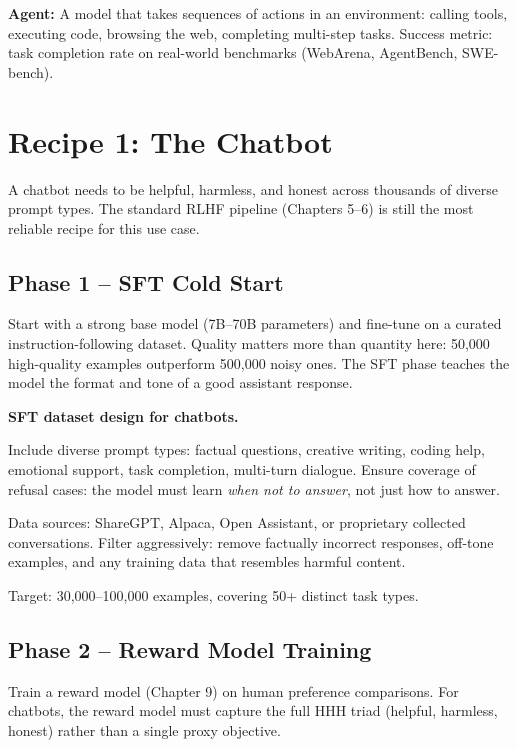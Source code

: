 \begin{chapterenv}
\begin{infobox}
\textbf{Agent:} A model that takes sequences of actions in an environment: calling tools, executing code, browsing the web, completing multi-step tasks. Success metric: task completion rate on real-world benchmarks (WebArena, AgentBench, SWE-bench).
\end{infobox}

\section{Recipe 1: The Chatbot}

A chatbot needs to be helpful, harmless, and honest across thousands of diverse prompt types. The standard RLHF pipeline (Chapters 5--6) is still the most reliable recipe for this use case.

\subsection{Phase 1 -- SFT Cold Start}

Start with a strong base model (7B--70B parameters) and fine-tune on a curated instruction-following dataset. Quality matters more than quantity here: 50,000 high-quality examples outperform 500,000 noisy ones. The SFT phase teaches the model the format and tone of a good assistant response.

\begin{tipbox}
\textbf{SFT dataset design for chatbots.}

Include diverse prompt types: factual questions, creative writing, coding help, emotional support, task completion, multi-turn dialogue. Ensure coverage of refusal cases: the model must learn \textit{when not to answer}, not just how to answer.

Data sources: ShareGPT, Alpaca, Open Assistant, or proprietary collected conversations. Filter aggressively: remove factually incorrect responses, off-tone examples, and any training data that resembles harmful content.

Target: 30,000--100,000 examples, covering 50+ distinct task types.
\end{tipbox}

\subsection{Phase 2 -- Reward Model Training}

Train a reward model (Chapter 9) on human preference comparisons. For chatbots, the reward model must capture the full HHH triad (helpful, harmless, honest) rather than a single proxy objective.


\end{chapterenv}
